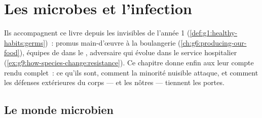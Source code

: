 \chapter{Les microbes et l'infection}\label{ch:g9:microbes-and-infection}

Ils accompagnent ce livre depuis les  invisibles de
l'année 1 (\cref{def:g1:healthy-habits:germs})~: promus
main-d'œuvre à la boulangerie
(\cref{ch:g6:producing-our-food}), équipes de 
dans le , adversaire qui évolue dans le service
hospitalier (\cref{ex:g9:how-species-change:resistance}). Ce
chapitre donne enfin aux  leur compte rendu
complet~: ce qu'ils sont, comment la minorité nuisible
attaque, et comment les défenses extérieures du corps --- et
les nôtres --- tiennent les portes.

\section{Le monde microbien}


